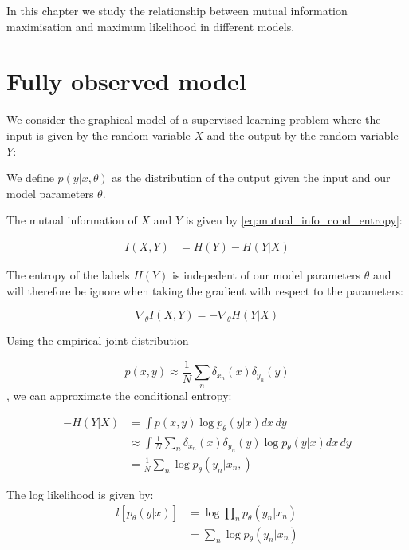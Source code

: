 \documentclass[10pt,oneside,openright]{report}
\begin{document}
In this chapter we study the relationship between mutual information maximisation and maximum likelihood in different models.

\section{Fully observed model}

We consider the graphical model of a supervised learning problem where the input is given by the random variable $X$ and the output by the random variable $Y$:

\begin{figure}[H]
\centering
{}
\end{figure}

We define $p(y|x, \theta)$ as the distribution of the output given the input and our model parameters $\theta$.

The mutual information of $X$ and $Y$ is given by \ref{eq:mutual_info_cond_entropy}:

\begin{align}
I(X, Y) &= H(Y) - H(Y|X)
\end{align}

The entropy of the labels $H(Y)$ is indepedent of our model parameters $\theta$ and will therefore be ignore when taking the gradient with respect to the parameters:

$$ \nabla_\theta I(X,Y) = -\nabla_\theta H(Y|X)$$ 

Using the empirical joint distribution 

$$p(x, y) \approx \frac{1}{N}\sum_n\delta_{x_n}(x)\delta_{y_n}(y)$$, we can approximate the conditional entropy:

\begin{align}
- H(Y|X) &= \int p(x, y) \log p_\theta(y|x) dx\, dy\\
	      &\approx \int \frac{1}{N}\sum_n\delta_{x_n}(x)\delta_{y_n}(y) \log p_\theta(y|x)dx\, dy\\
	      &= \frac{1}{N} \sum_n \log p_\theta(y_n|x_n,)
\end{align}

The log likelihood is given by:
\begin{align}
 l[p_\theta(y|x)] &= \log \prod_n p_\theta(y_n|x_n)\\
 	      &= \sum_n \log p_\theta(y_n|x_n)
\end{align}
\end{document}
